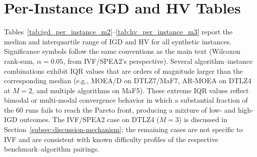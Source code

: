 \documentclass[pdflatex,sn-mathphys-ay]{sn-jnl}%
\theoremstyle{thmstyleone}%
\theoremstyle{thmstyletwo}%
\theoremstyle{thmstylethree}%
\begin{document}
\section{Per-Instance IGD and HV Tables}\label{app:tables}

Tables~\ref{tab:igd_per_instance_m2}--\ref{tab:hv_per_instance_m3} report the median and interquartile range of IGD and HV for all synthetic instances. Significance symbols follow the same conventions as the main text (Wilcoxon rank-sum, $\alpha=0.05$, from IVF/SPEA2's perspective). Several algorithm--instance combinations exhibit IQR values that are orders of magnitude larger than the corresponding median (e.g., MOEA/D on DTLZ7/MaF7, AR-MOEA on DTLZ4 at $M{=}2$, and multiple algorithms on MaF5). These extreme IQR values reflect bimodal or multi-modal convergence behavior in which a substantial fraction of the 60 runs fails to reach the Pareto front, producing a mixture of low- and high-IGD outcomes. The IVF/SPEA2 case on DTLZ4 ($M{=}3$) is discussed in Section~\ref{subsec:discussion-mechanism}; the remaining cases are not specific to IVF and are consistent with known difficulty profiles of the respective benchmark--algorithm pairings.
\end{document}
